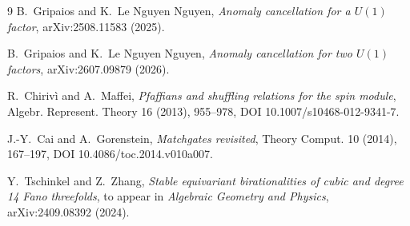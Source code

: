 \documentclass[11pt]{article}
\theoremstyle{definition}
\theoremstyle{remark}
\begin{document}
\begin{thebibliography}{9}
B.~Gripaios and K.~Le Nguyen Nguyen,
\emph{Anomaly cancellation for a \(U(1)\) factor},
arXiv:2508.11583 (2025).

B.~Gripaios and K.~Le Nguyen Nguyen,
\emph{Anomaly cancellation for two \(U(1)\) factors},
arXiv:2607.09879 (2026).

R.~Chiriv\`i and A.~Maffei,
\emph{Pfaffians and shuffling relations for the spin module},
Algebr. Represent. Theory 16 (2013), 955--978,
DOI 10.1007/s10468-012-9341-7.

J.-Y.~Cai and A.~Gorenstein,
\emph{Matchgates revisited},
Theory Comput. 10 (2014), 167--197,
DOI 10.4086/toc.2014.v010a007.

Y.~Tschinkel and Z.~Zhang,
\emph{Stable equivariant birationalities of cubic and degree 14 Fano
threefolds},
to appear in \emph{Algebraic Geometry and Physics},
arXiv:2409.08392 (2024).

\end{thebibliography}
\end{document}
